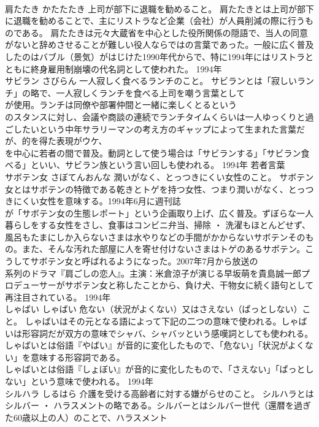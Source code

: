 \documentclass[8pt]{extreport}
\begin{document}
\begin{CJK}{UTF8}{min}
\\	肩たたき	かたたたき	上司が部下に退職を勧めること。	肩たたきとは上司が部下に退職を勧めることで、主にリストラなど企業（会社）が人員削減の際に行うものである。 肩たたきは元々大蔵省を中心とした役所関係の隠語で、当人の同意がないと辞めさせることが難しい役人ならではの言葉であった。一般に広く普及したのはバブル（景気）がはじけた1990年代からで、特に1994年にはリストラとともに終身雇用制崩壊の代名詞として使われた。	1994年	
\\	サビラン	さびらん	一人寂しく食べるランチのこと。	サビランとは「寂しいランチ」の略で、一人寂しくランチを食べる上司を嘲う言葉として
\\	が使用。ランチは同僚や部署仲間と一緒に楽しくとるという
\\	のスタンスに対し、会議や商談の連続でランチタイムくらいは一人ゆっくりと過ごしたいという中年サラリーマンの考え方のギャップによって生まれた言葉だが、的を得た表現がウケ、
\\	を中心に若者の間で普及。動詞として使う場合は「サビランする」「サビラン食べる」といい、サビラン族という言い回しも使われる。	1994年	若者言葉	
\\	サボテン女	さぼてんおんな	潤いがなく、とっつきにくい女性のこと。	サボテン女とはサボテンの特徴である乾きとトゲを持つ女性、つまり潤いがなく、とっつきにくい女性を意味する。1994年6月に週刊誌
\\	が「サボテン女の生態レポート」という企画取り上げ、広く普及。ずぼらな一人暮らしをする女性をさし、食事はコンビニ弁当、掃除 ・ 洗濯もほとんどせず、風呂もたまにしか入らないさまは水やりなどの手間がかからないサボテンそのもの。また、そんな汚れた部屋に人を寄せ付けないさまはトゲのあるサボテン。こうしてサボテン女と呼ばれるようになった。2007年7月から放送の
\\	系列のドラマ『肩ごしの恋人』。主演：米倉涼子が演じる早坂萌を貴島誠一郎プロデューサーがサボテン女と称したことから、負け犬、干物女に続く語句として再注目されている。	1994年	
\\	しゃばい	しゃばい	危ない（状況がよくない）又はさえない（ぱっとしない）こと。	しゃばいはその元となる語によって下記の二つの意味で使われる。しゃばいは形容詞だが双方の意味でシャバ、シャバッという感嘆詞としても使われる。 
\\	しゃばいとは俗語『やばい』が音的に変化したもので、「危ない」「状況がよくない」を意味する形容詞である。 
\\	しゃばいとは俗語『しょぼい』が音的に変化したもので、「さえない」「ぱっとしない」という意味で使われる。	1994年	
\\	シルハラ	しるはら	介護を受ける高齢者に対する嫌がらせのこと。	シルハラとはシルバー ・ ハラスメントの略である。シルバーとはシルバー世代（還暦を過ぎた60歳以上の人）のことで、ハラスメント

\end{CJK}
\end{document}
